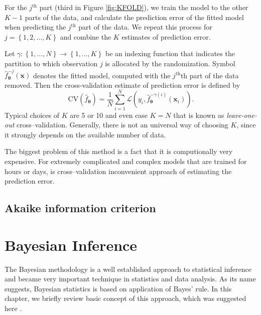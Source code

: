 For the $j^{\mathrm{th}}$ part (third in Figure \ref{fig:KFOLD}), we train the model to the other $K-1$ parts
of the data, and calculate the prediction error of the fitted model when
predicting the $j^{\mathrm{th}}$ part of the data. We repeat this process for $j = \left\lbrace 1,2,\dots,K\right\rbrace$ and
combine the $K$ estimates of prediction error.

Let $\gamma : \left\lbrace 1,\dots,N\right\rbrace\rightarrow  \left\lbrace 1,\dots,K\right\rbrace$ be an indexing
function that indicates the partition to which observation $j$ is allocated by
the randomization. Symbol $\hat{f}_{\boldsymbol{\theta}}^{-j}\left(\boldsymbol{x}\right)$ denotes the fitted model, computed with
the $j^{\mathrm{th}}$th part of the data removed. Then the cross-validation estimate of
prediction error is defined by
\begin{equation}
\mathrm{CV}\left(\hat{f}_{\boldsymbol{\theta}}\right) = \frac{1}{N}\sum_{i = 1}^{N}\mathcal{L}\left(y_i , \hat{f}_{\boldsymbol{\theta}}^{-\gamma\left(i\right)}\left(\boldsymbol{x}_i\right)\right).
\end{equation}
Typical choices of $K$ are 5 or 10 and even case $K = N$ that is known as \emph{leave-one-out} cross--validation. Generally, there is not an universal way of choosing $K$, since it strongly depends on the available number of data. 

The biggest problem of this method is a fact that it is computionally very expensive. For extremely complicated and complex models that are trained for hours or days, is cross--validation inconvenient approach of estimating the prediction error.
\subsection{Akaike information criterion}



\section{Bayesian Inference}
The Bayesian methodology is a well established approach to statistical inference and became very important technique in statistics and data analysis. As its name suggests, Bayesian statistics is based on application of Bayes' rule. In this chapter, we briefly review basic concept of this approach, which was suggested here \cite{smidl}. 

